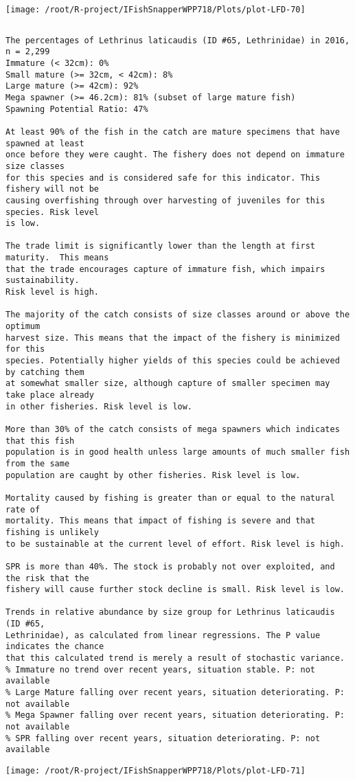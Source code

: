 \documentclass{report}\usepackage[]{graphicx}\usepackage[]{color}
\makeatletter
\def\maxwidth{ %
  \ifdim\Gin@nat@width>\linewidth
    \linewidth
  \else
    \Gin@nat@width
  \fi
}
\newenvironment{kframe}{%
 \def\at@end@of@kframe{}%
 \ifinner\ifhmode%
  \def\at@end@of@kframe{\end{minipage}}%
  \begin{minipage}{\columnwidth}%
 \fi\fi%
 \def\FrameCommand##1{\hskip\@totalleftmargin \hskip-\fboxsep
 \colorbox{shadecolor}{##1}\hskip-\fboxsep
     \hskip-\linewidth \hskip-\@totalleftmargin \hskip\columnwidth}%
 \MakeFramed {\advance\hsize-\width
   \@totalleftmargin\z@ \linewidth\hsize
   \@setminipage}}%
 {\par\unskip\endMakeFramed%
 \at@end@of@kframe}
\newenvironment{knitrout}{}{} %
\makeatother
\begin{document}
\begin{knitrout}
\texttt{[image: /root/R-project/IFishSnapperWPP718/Plots/plot-LFD-70]} 
\begin{kframe}\begin{verbatim}
\end{verbatim}
\end{kframe}
\clearpage
\newpage
\begin{kframe}\begin{verbatim}The percentages of Lethrinus laticaudis (ID #65, Lethrinidae) in 2016, n = 2,299
Immature (< 32cm): 0%
Small mature (>= 32cm, < 42cm): 8%
Large mature (>= 42cm): 92%
Mega spawner (>= 46.2cm): 81% (subset of large mature fish)
Spawning Potential Ratio: 47%
 
At least 90% of the fish in the catch are mature specimens that have spawned at least
once before they were caught. The fishery does not depend on immature size classes
for this species and is considered safe for this indicator. This fishery will not be
causing overfishing through over harvesting of juveniles for this species. Risk level
is low.

The trade limit is significantly lower than the length at first maturity.  This means
that the trade encourages capture of immature fish, which impairs sustainability.
Risk level is high.

The majority of the catch consists of size classes around or above the optimum
harvest size. This means that the impact of the fishery is minimized for this
species. Potentially higher yields of this species could be achieved by catching them
at somewhat smaller size, although capture of smaller specimen may take place already
in other fisheries. Risk level is low.

More than 30% of the catch consists of mega spawners which indicates that this fish
population is in good health unless large amounts of much smaller fish from the same
population are caught by other fisheries. Risk level is low.
 
Mortality caused by fishing is greater than or equal to the natural rate of
mortality. This means that impact of fishing is severe and that fishing is unlikely
to be sustainable at the current level of effort. Risk level is high.
 
SPR is more than 40%. The stock is probably not over exploited, and the risk that the
fishery will cause further stock decline is small. Risk level is low.
 
Trends in relative abundance by size group for Lethrinus laticaudis (ID #65,
Lethrinidae), as calculated from linear regressions. The P value indicates the chance
that this calculated trend is merely a result of stochastic variance.
% Immature no trend over recent years, situation stable. P: not available
% Large Mature falling over recent years, situation deteriorating. P: not available
% Mega Spawner falling over recent years, situation deteriorating. P: not available
% SPR falling over recent years, situation deteriorating. P: not available
\end{verbatim}
\end{kframe}
\texttt{[image: /root/R-project/IFishSnapperWPP718/Plots/plot-LFD-71]} 


\end{knitrout}
\end{document}

